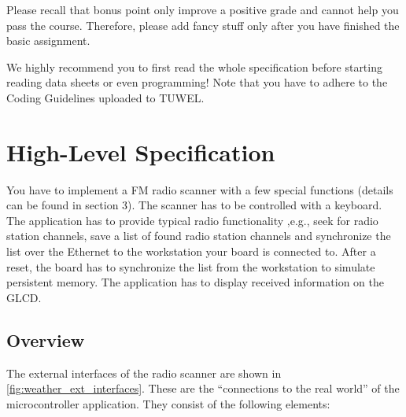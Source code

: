 \documentclass[a4paper,10pt]{article}
\begin{document}
\medskip

Please recall that bonus point only improve a positive grade and
	cannot help you pass the course.
Therefore, please add fancy stuff only after you have finished the
	basic assignment.

\medskip

We highly recommend you to first read the whole specification before starting
	reading data sheets or even programming!
Note that you have to adhere to the Coding Guidelines uploaded to TUWEL.

\section{High-Level Specification}

You have to implement a FM radio scanner with a few special functions (details can be found in section 3).
The scanner has to be controlled with a keyboard. The application has to provide
typical radio functionality ,e.g., seek for radio station channels, save a list of found radio station channels and synchronize the list
over the Ethernet to the workstation your board is connected to. After a reset,
the board has to synchronize the list from the workstation to simulate persistent memory.
The application has to display received information on the GLCD.
\subsection{Overview}

The external interfaces of the radio scanner are shown in
	\cref{fig:weather_ext_interfaces}.
These are the ``connections to the real world'' of the microcontroller
	application.
They consist of the following elements:
\end{document}

